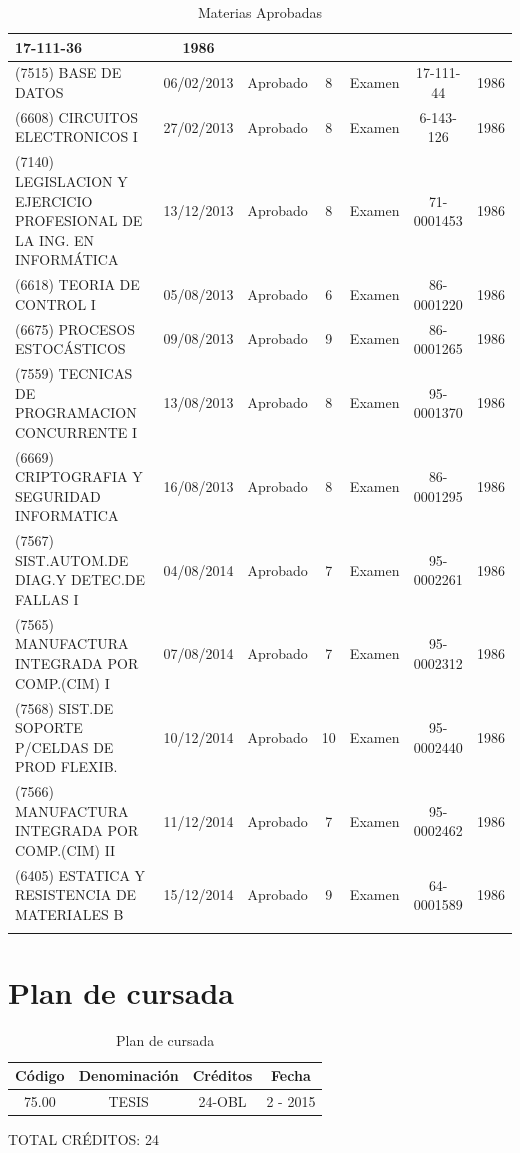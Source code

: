 \documentclass[a4paper,10pt]{article}
\begin{document}
\begin{center}
\begin{longtable}{|p{3.5cm}|c|c|c|p{1.4cm}|c|c|}
			17-111-36 & 1986 \\
			\hline
			(7515) BASE DE DATOS & 06/02/2013 & Aprobado & 8 & Examen & 
			17-111-44 & 1986 \\
			\hline
			(6608) CIRCUITOS ELECTRONICOS I & 27/02/2013 & Aprobado & 8 & Examen
			& 6-143-126 & 1986 \\
			\hline
			(7140) LEGISLACION Y EJERCICIO PROFESIONAL DE LA ING. EN INFORMÁTICA
			& 13/12/2013 & Aprobado & 8 & Examen & 71-0001453 & 1986 \\
			\hline
			(6618) TEORIA DE CONTROL I & 05/08/2013 & Aprobado & 6 & Examen & 
			86-0001220 & 1986 \\
			\hline
			(6675) PROCESOS ESTOCÁSTICOS & 09/08/2013 & Aprobado & 9 & Examen & 
			86-0001265 & 1986 \\
			\hline
			(7559) TECNICAS DE PROGRAMACION CONCURRENTE I & 13/08/2013 & 
			Aprobado & 8 & Examen & 95-0001370 & 1986 \\
			\hline
			(6669) CRIPTOGRAFIA Y SEGURIDAD INFORMATICA & 16/08/2013 & Aprobado
			& 8 & Examen & 86-0001295 & 1986 \\
			\hline
			(7567) SIST.AUTOM.DE DIAG.Y DETEC.DE FALLAS I & 04/08/2014 & 
			Aprobado & 7 & Examen & 95-0002261 & 1986 \\
			\hline
			(7565) MANUFACTURA INTEGRADA POR COMP.(CIM) I & 07/08/2014 & 
			Aprobado & 7 & Examen & 95-0002312 & 1986 \\
			\hline
			(7568) SIST.DE SOPORTE P/CELDAS DE PROD FLEXIB. & 10/12/2014 & 
			Aprobado & 10 & Examen & 95-0002440 & 1986 \\
			\hline
			(7566) MANUFACTURA INTEGRADA POR COMP.(CIM) II & 11/12/2014 & 
			Aprobado & 7 & Examen & 95-0002462 & 1986 \\
			\hline
			(6405) ESTATICA Y RESISTENCIA DE MATERIALES B & 15/12/2014 & 
			Aprobado & 9 & Examen & 64-0001589 & 1986 \\
			\hline
			\caption{Materias Aprobadas} \label{tab:matApr}
		\end{longtable}
	\end{center}
	\newpage
	\section{Plan de cursada}
	
	\begin{table}[!htb]
		\centering
		\begin{tabular}{|c|c|c|c|}
			\hline
			Código & Denominación & Créditos & Fecha \\
			\hline
			75.00 & TESIS & 24-OBL & 2 - 2015 \\
			\hline
		\end{tabular}
		\caption{Plan de cursada} \label{tabPlanCursada}
	\end{table}

	TOTAL CRÉDITOS: 24	
\end{document}
